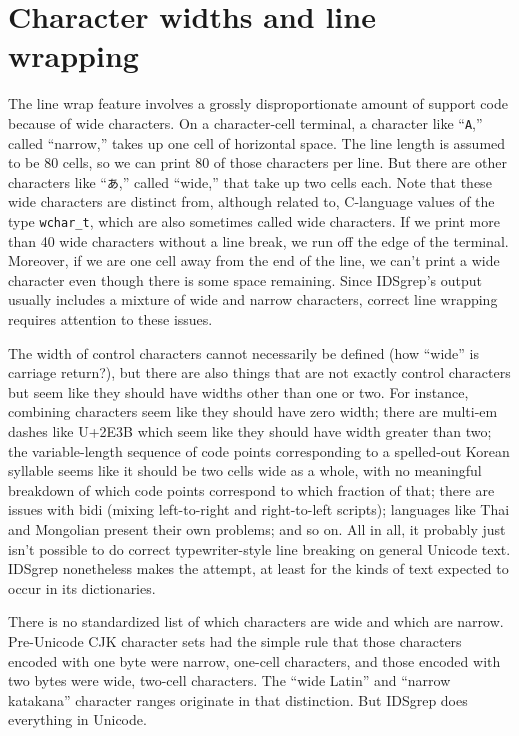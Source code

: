\documentclass[twocolumn]{report}
\newcommand{\DangerousSection}{\marginpar{\large\hfill
\raisebox{-0.5\baselineskip}[0pt][0pt]{\dbend}\hfill\null}}
\begin{document}

\section{Character widths and line wrapping}\DangerousSection

The line wrap feature involves a grossly disproportionate amount of support
code because of wide characters.  On a character-cell terminal, a character
like ``\texttt{A},'' called ``narrow,'' takes up one cell of horizontal
space.  The line length is assumed to be 80 cells, so we can print 80 of
those characters per line.  But there are other characters like
``\texttt{あ},'' called ``wide,'' that take up two cells each.  Note that
these wide characters are distinct from, although related to, C-language
values of the type \texttt{wchar\_t}, which are also sometimes called wide
characters.  If we print more than 40 wide characters without a line break,
we run off the edge of the terminal.  Moreover, if we are one cell away from
the end of the line, we can't print a wide character even though there is
some space remaining.  Since IDSgrep's output usually includes a mixture of
wide and narrow characters, correct line wrapping requires attention to
these issues.

The width of control characters cannot necessarily be defined (how ``wide''
is carriage return?), but there are also things that are not exactly control
characters but seem like they should have widths other than one or two.  For
instance, combining characters seem like they should have zero width; there
are multi-em dashes like U+2E3B which seem like they should have width
greater than two; the variable-length sequence of code points corresponding
to a spelled-out Korean syllable seems like it should be two cells wide as a
whole, with no meaningful breakdown of which code points
correspond to which fraction of that; there are issues with bidi (mixing
left-to-right and right-to-left scripts); languages like Thai and Mongolian
present their own problems; and so on.  All in all, it probably just isn't
possible to do correct typewriter-style line breaking on general Unicode
text.  IDSgrep nonetheless makes the attempt, at least for the kinds of text
expected to occur in its dictionaries.

There is no standardized list of which characters are wide and which are
narrow.  Pre-Unicode CJK character sets had the simple rule that those
characters encoded with one byte were narrow, one-cell characters, and those
encoded with two bytes were wide, two-cell characters.  The ``wide Latin''
and ``narrow katakana'' character ranges originate in that distinction.  But
IDSgrep does everything in Unicode.
\end{document}
